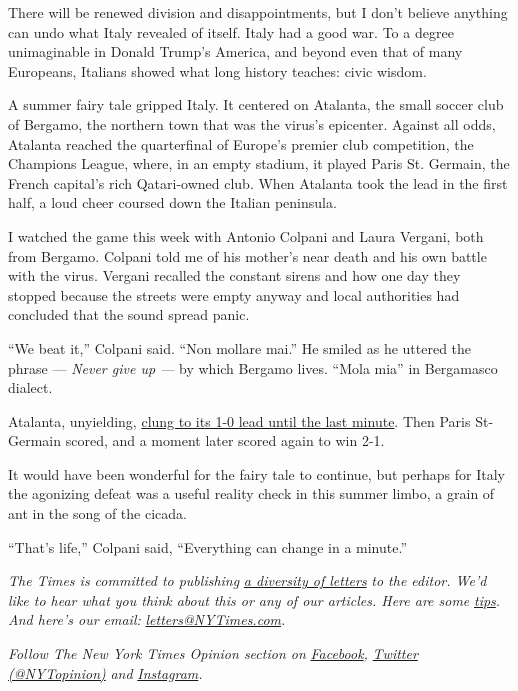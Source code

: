 There will be renewed division and disappointments, but I don't believe
anything can undo what Italy revealed of itself. Italy had a good war.
To a degree unimaginable in Donald Trump's America, and beyond even that
of many Europeans, Italians showed what long history teaches: civic
wisdom.

A summer fairy tale gripped Italy. It centered on Atalanta, the small
soccer club of Bergamo, the northern town that was the virus's
epicenter. Against all odds, Atalanta reached the quarterfinal of
Europe's premier club competition, the Champions League, where, in an
empty stadium, it played Paris St. Germain, the French capital's rich
Qatari-owned club. When Atalanta took the lead in the first half, a loud
cheer coursed down the Italian peninsula.

I watched the game this week with Antonio Colpani and Laura Vergani,
both from Bergamo. Colpani told me of his mother's near death and his
own battle with the virus. Vergani recalled the constant sirens and how
one day they stopped because the streets were empty anyway and local
authorities had concluded that the sound spread panic.

``We beat it,'' Colpani said. ``Non mollare mai.'' He smiled as he
uttered the phrase --- \emph{Never give up ---} by which Bergamo lives.
``Mola mia'' in Bergamasco dialect.

Atalanta, unyielding,
\href{https://www.espn.com/soccer/report?gameId=573701}{clung to its 1-0
lead until the last minute}. Then Paris St-Germain scored, and a moment
later scored again to win 2-1.

It would have been wonderful for the fairy tale to continue, but perhaps
for Italy the agonizing defeat was a useful reality check in this summer
limbo, a grain of ant in the song of the cicada.

``That's life,'' Colpani said, ``Everything can change in a minute.''

\emph{The Times is committed to publishing}
\href{https://www.nytimes3xbfgragh.onion/2019/01/31/opinion/letters/letters-to-editor-new-york-times-women.html}{\emph{a
diversity of letters}} \emph{to the editor. We'd like to hear what you
think about this or any of our articles. Here are some}
\href{https://help.nytimes3xbfgragh.onion/hc/en-us/articles/115014925288-How-to-submit-a-letter-to-the-editor}{\emph{tips}}\emph{.
And here's our email:}
\href{mailto:letters@NYTimes.com}{\emph{letters@NYTimes.com}}\emph{.}

\emph{Follow The New York Times Opinion section on}
\href{https://www.facebookcorewwwi.onion/nytopinion}{\emph{Facebook}}\emph{,}
\href{http://twitter.com/NYTOpinion}{\emph{Twitter (@NYTopinion)}}
\emph{and}
\href{https://www.instagram.com/nytopinion/}{\emph{Instagram}}\emph{.}

